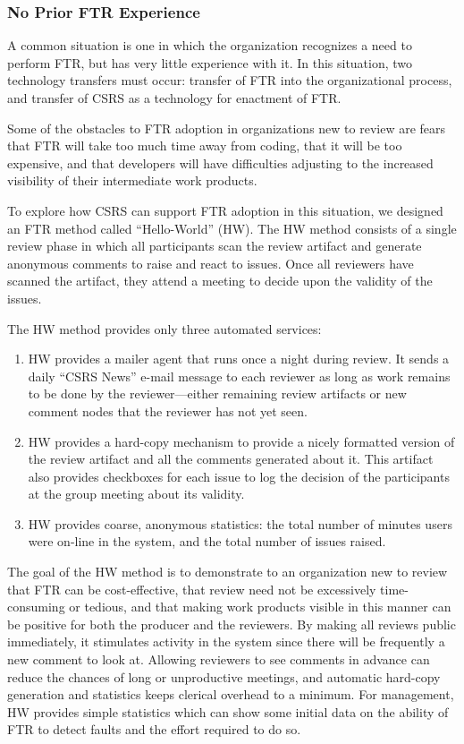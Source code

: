 \subsubsection{No Prior FTR Experience} 

A common situation is one in which the organization recognizes a need to
perform FTR, but has very little experience with it.  In this situation,
two technology transfers must occur: transfer of FTR into the
organizational process, and transfer of CSRS as a technology for enactment
of FTR.

Some of the obstacles to FTR adoption in organizations new to review are
fears that FTR will take too much time away from coding, that it will be
too expensive, and that developers will have difficulties adjusting to the
increased visibility of their intermediate work products.

To explore how CSRS can support FTR adoption in this situation, we designed
an FTR method called ``Hello-World'' (HW).  The HW method consists of a
single review phase in which all participants scan the review artifact and
generate anonymous comments to raise and react to issues.  Once all
reviewers have scanned the artifact, they attend a meeting to decide upon
the validity of the issues.  

The HW method provides only three automated services:
\begin{enumerate}

\item HW provides a mailer agent that runs once a night during review. It
sends a daily ``CSRS News'' e-mail message to each reviewer as long as
work remains to be done by the reviewer---either remaining review artifacts
or new comment nodes that the reviewer has not yet seen.

\item HW provides a hard-copy mechanism to provide a nicely formatted
version of the review artifact and all the comments generated about it.
This artifact also provides checkboxes for each issue to log the decision
of the participants at the group meeting about its validity.

\item HW provides coarse, anonymous statistics: the total number of minutes
users were on-line in the system, and the total number of issues raised.
\end{enumerate}


The goal of the HW method is to demonstrate to an organization new to
review that FTR can be cost-effective, that review need not be excessively
time-consuming or tedious, and that making work products visible in this
manner can be positive for both the producer and the reviewers.  By making
all reviews public immediately, it stimulates activity in the system since
there will be frequently a new comment to look at.  Allowing reviewers to
see comments in advance can reduce the chances of long or unproductive
meetings, and automatic hard-copy generation and statistics keeps clerical
overhead to a minimum.  For management, HW provides simple statistics which
can show some initial data on the ability of FTR to detect faults and the
effort required to do so.

